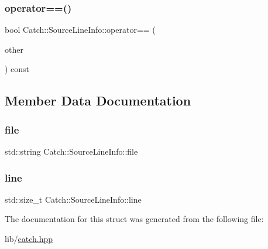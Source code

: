 \hypertarget{struct_catch_1_1_source_line_info_a688e761986879266658f000f14ab8a42}{}\label{struct_catch_1_1_source_line_info_a688e761986879266658f000f14ab8a42} 
\subsubsection{\texorpdfstring{operator==()}{operator==()}}
{\footnotesize\ttfamily bool Catch\+::\+Source\+Line\+Info\+::operator== (\begin{DoxyParamCaption}\item[{\hyperlink{struct_catch_1_1_source_line_info}{Source\+Line\+Info} const \&}]{other }\end{DoxyParamCaption}) const}



\subsection{Member Data Documentation}
\hypertarget{struct_catch_1_1_source_line_info_adf3ccf0c2bd326eb3466318af82a94dd}{}\label{struct_catch_1_1_source_line_info_adf3ccf0c2bd326eb3466318af82a94dd} 
\subsubsection{\texorpdfstring{file}{file}}
{\footnotesize\ttfamily std\+::string Catch\+::\+Source\+Line\+Info\+::file}

\hypertarget{struct_catch_1_1_source_line_info_a841e5d696c7b9cde24e45e61dd979c77}{}\label{struct_catch_1_1_source_line_info_a841e5d696c7b9cde24e45e61dd979c77} 
\subsubsection{\texorpdfstring{line}{line}}
{\footnotesize\ttfamily std\+::size\+\_\+t Catch\+::\+Source\+Line\+Info\+::line}



The documentation for this struct was generated from the following file\+:\begin{DoxyCompactItemize}
\item 
lib/\hyperlink{catch_8hpp}{catch.\+hpp}\end{DoxyCompactItemize}
